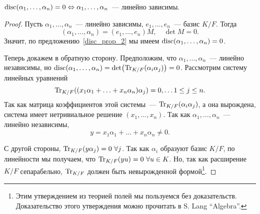 		\begin{statement} 
			$\operatorname{disc}(\alpha_1, \ldots, \alpha_n) = 0 \Leftrightarrow \alpha_1, \ldots, \alpha_n$~--- линейно зависимы. 
		\end{statement}
		\begin{proof}
			Пусть $\alpha_1, \ldots, \alpha_n$~--- линейно зависимы, $e_1, \ldots, e_n$~--- базис $K/F$. Тогда
			\[
				(\alpha_1, \ldots, \alpha_n) = (e_1, \ldots, e_n)M, \quad \det{M} = 0.
			\]
			Значит, по предложению~\ref{disc_prop_2} мы имеем $\operatorname{disc}(\alpha_1, \ldots, \alpha_n) = 0$. 

			Теперь докажем в обратную сторону. 
			Предположим, что $\alpha_1, \ldots, \alpha_n$~--- линейно независимы, но $\disc(\alpha_1, \ldots, \alpha_n) = \det\lr*{\Tr_{K/F}(\alpha_i \alpha_j)} = 0$. Рассмотрим систему линейных уравнений 
			\[
				\Tr_{K/F}\lr*{(x_1 \alpha_1 + \ldots + x_n \alpha_n)\alpha_j} = 0, \ldots 1 \le j \le n.
			\]
			Так как матрица коэффициентов этой системы~--- $\operatorname{Tr}_{K/F}(\alpha_i \alpha_j)$, а она вырождена, система имеет нетривиальное решение $(x_1, \ldots, x_n)$. Так как $\alpha_1, \ldots, \alpha_n$~--- линейно независимы, 
			\[
				y = x_1 \alpha_1 + \ldots +  x_n \alpha_n \neq 0.
			\]

			С другой стороны, $\operatorname{Tr}_{K/F}(y \alpha_{j}) = 0 \ \forall j$. Так как $\alpha_i$ образуют базис $K/F$, по линейности мы получаем, что $\operatorname{Tr}_{K/F}(y u) = 0 \ \forall u \in K$. Но, так как расширение $K/F$ сепарабельно, $\operatorname{Tr}_{K/F}$ должен быть невырожденной формой\footnote{Этим утверждением из теорией полей мы пользуемся без доказательств. Доказательство этого утверждения можно прочитать в S. Lang ``Algebra''. }.
			

		\end{proof}

